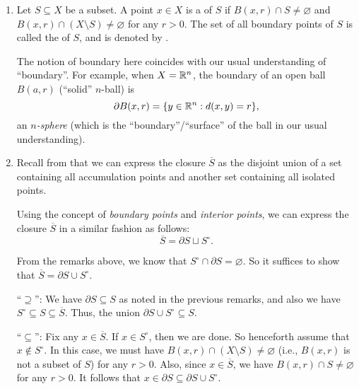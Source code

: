 \begin{enumerate}
\item Let \(S\subseteq X\) be a subset. A point \(x\in X\) is a  of \(S\) if \(B(x,r)\cap S\ne\varnothing\) and \(B(x,r)\cap (X\setminus
S)\ne\varnothing\) for any \(r>0\). The set of all boundary points of \(S\) is
called the  of \(S\), and is denoted by .


The notion of boundary here coincides with our usual understanding of
``boundary''. For example, when \(X=\mathbb{R}^n\), the boundary of an open ball
\(B(a,r)\) (``solid'' \(n\)-ball) is
\[
\partial B(x,r)=\{y\in\mathbb{R}^n:d(x,y)=r\},
\]
an \emph{\(n\)-sphere} (which is the ``boundary''/``surface'' of the ball in
our usual understanding).

\item \label{it:closure-decompose-bound-interior} Recall from
 that we can express the closure
\(\overline{S}\) as the disjoint union of a set containing all accumulation
points and another set containing all isolated points.

Using the concept of \emph{boundary points} and \emph{interior points}, we can
express the closure \(\overline{S}\) in a similar fashion as follows:
\[
\overline{S}=\partial S\sqcup S^{\circ}.
\]
\begin{pf}
From the remarks above, we know that \(S^{\circ}\cap \partial S=\varnothing\).
So it suffices to show that \(\overline{S}=\partial S\cup S^{\circ}\).

``\(\supseteq\)'': We have \(\partial S\subseteq S\) as noted in the previous
remarks, and also we have \(S^{\circ}\subseteq S\subseteq \overline{S}\). Thus,
the union \(\partial S\cup S^{\circ}\subseteq S\).

``\(\subseteq\)'': Fix any \(x\in\overline{S}\). If \(x\in S^{\circ}\), then we
are done. So henceforth assume that \(x\notin S^{\circ}\). In this case, we
must have \(B(x,r)\cap (X\setminus S)\ne\varnothing\) (i.e., \(B(x,r)\) is not
a subset of \(S\)) for any \(r>0\). Also, since \(x\in\overline{S}\), we have
\(B(x,r)\cap S\ne\varnothing\) for any \(r>0\). It follows that \(x\in\partial
S\subseteq \partial S\cup S^{\circ}\).
\end{pf}
\end{enumerate}
